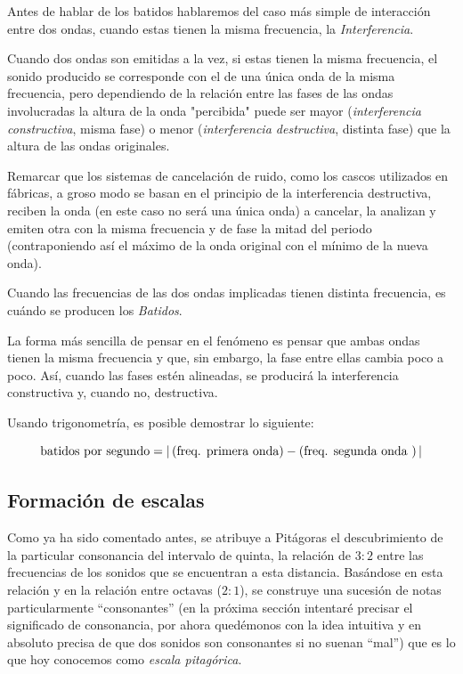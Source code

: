 \documentclass[11pt,a4paper]{article}
\begin{document}
	Antes de hablar de los batidos hablaremos del caso más simple de interacción entre dos ondas, cuando estas tienen la misma frecuencia, la \emph{Interferencia}.
	
	Cuando dos ondas son emitidas a la vez, si estas tienen la misma frecuencia, el sonido producido se corresponde con el de una única onda de la misma frecuencia, pero dependiendo de la relación entre las fases de las ondas involucradas la altura de la onda "percibida" puede ser mayor (\emph{interferencia constructiva}, misma fase) o menor (\emph{interferencia destructiva}, distinta fase) que la altura de las ondas originales.
	
	Remarcar que los sistemas de cancelación de ruido, como los cascos utilizados en fábricas, a groso modo se basan en el principio de la interferencia destructiva\cite{Set}, reciben la onda (en este caso no será una única onda) a cancelar, la analizan y emiten otra con la misma frecuencia y de fase la mitad del periodo (contraponiendo así el máximo de la onda original con el mínimo de la nueva onda).
	
	Cuando las frecuencias de las dos ondas implicadas tienen distinta frecuencia, es cuándo se producen los \emph{Batidos}.
	
	La forma más sencilla de pensar en el fenómeno es pensar que ambas ondas tienen la misma frecuencia y que, sin embargo, la fase entre ellas cambia poco a poco. Así, cuando las fases estén alineadas, se producirá la interferencia constructiva y, cuando no, destructiva.
	
	Usando trigonometría, es posible demostrar lo siguiente:
	
	$$
	  \hbox{\textnormal{batidos por segundo}} = | \left(\textnormal{freq. primera onda} \right) - \left( \textnormal{freq. segunda onda }\right) |
    $$
    
	\subsection{Formación de escalas}

	Como ya ha sido comentado antes, se atribuye a Pitágoras el descubrimiento de la particular consonancia del intervalo de quinta, la relación de $3:2$ entre las frecuencias de los sonidos que se encuentran a esta distancia. Basándose en esta relación y en la relación entre octavas ($2:1$), se construye una sucesión de notas particularmente ``consonantes'' (en la próxima sección intentaré precisar el significado de consonancia, por ahora quedémonos con la idea intuitiva y en absoluto precisa de que dos sonidos son consonantes si no suenan ``mal'') que es lo que hoy conocemos como \emph{escala pitagórica}.
	
\end{document}
